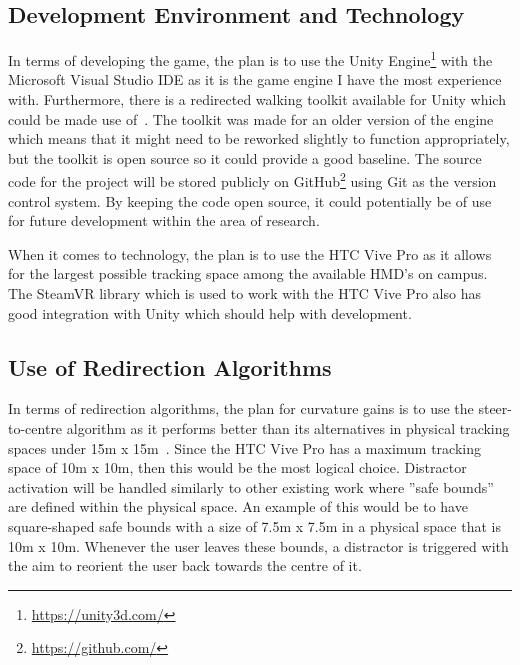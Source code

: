 \subsection{Development Environment and Technology}
In terms of developing the game, the plan is to use the Unity Engine\footnote{\url{https://unity3d.com/}} with the Microsoft Visual Studio IDE as it is the game engine I have the most experience with. Furthermore, there is a redirected walking toolkit available for Unity which could be made use of~\cite{azmandian2016redirected}. The toolkit was made for an older version of the engine which means that it might need to be reworked slightly to function appropriately, but the toolkit is open source so it could provide a good baseline. The source code for the project will be stored publicly on GitHub\footnote{\url{https://github.com/}} using Git as the version control system. By keeping the code open source, it could potentially be of use for future development within the area of research. 

When it comes to technology, the plan is to use the HTC Vive Pro as it allows for the largest possible tracking space among the available HMD's on campus. The SteamVR library which is used to work with the HTC Vive Pro also has good integration with Unity which should help with development.

\subsection{Use of Redirection Algorithms}
In terms of redirection algorithms, the plan for curvature gains is to use the steer-to-centre algorithm as it performs better than its alternatives in physical tracking spaces under 15m x 15m~\cite{azmandian2015physical}. Since the HTC Vive Pro has a maximum tracking space of 10m x 10m, then this would be the most logical choice. Distractor activation will be handled similarly to other existing work where ''safe bounds'' are defined within the physical space. An example of this would be to have square-shaped safe bounds with a size of 7.5m x 7.5m in a physical space that is 10m x 10m. Whenever the user leaves these bounds, a distractor is triggered with the aim to reorient the user back towards the centre of it. 

